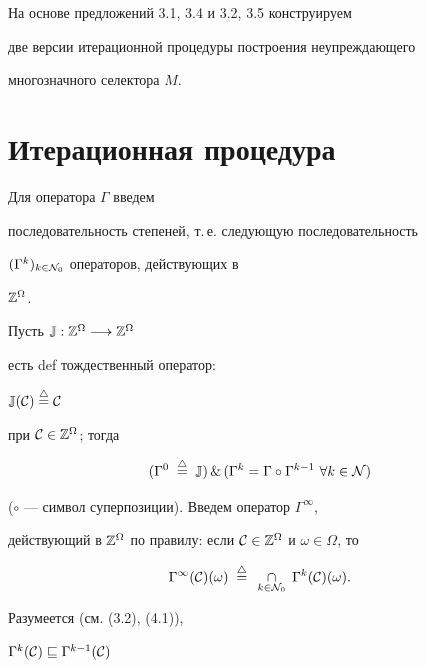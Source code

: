 На основе предложений 3.1, 3.4 и 3.2, 3.5 конструируем


две версии итерационной процедуры построения неупреждающего


многозначного селектора $M$.





\section{Итерационная процедура}





Для оператора $\Gamma$ введем


последовательность степеней, т.\,е. следующую последовательность


$({\Gamma}^k)_{k \in {{\cal N}_0}}$ операторов, действующих в


${\Bbb Z}^{\Omega}$.


Пусть ${\Bbb J}:{{\Bbb Z}^{\Omega}} \longrightarrow {{\Bbb Z}^{\Omega}}$


есть def тождественный оператор:


${{\Bbb J}({\cal C})}\overset{\triangle}{=}{} {\cal C}$


при ${\cal C} \in {{\Bbb Z}^{\Omega}}$; тогда


\begin{equation}


({{\Gamma}^0}\;\stac \;{\Bbb J})\, \&\,


({{\Gamma}^k} = {\Gamma} \circ {{\Gamma}^{k-1}}


\ \forall{k} \in {\cal N})


\end{equation}


($\circ$ --- символ суперпозиции). Введем оператор ${\Gamma}^\infty$,


действующий в ${\Bbb Z}^{\Omega}$ по правилу: если ${\cal C} \in


{{\Bbb Z}^{\Omega}}$ и $\omega \in \Omega$, то


\begin{equation}


{{\Gamma}^{\infty}}({\cal C})(\omega)\;\stac \;


\mathop{\cap}\limits_{k \in {{\cal N}_0}}\; {{\Gamma}^k}({\cal C})(\omega).


\end{equation}


Разумеется (см. (3.2), (4.1)),


${{\Gamma}^k}({\cal C})\sqsubseteq{{\Gamma}^{k-1}}({\cal C})$


